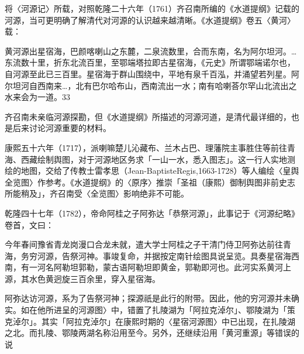 
\vfill
\begin{BookNotes}
\end{BookNotes}


将〈河源记〉所载，对照乾隆二十六年（1761）齐召南所编的《水道提纲》记载的河源，当可更明确了解清代对河源的认识越来越清晰。《水道提纲》卷五〈黄河〉载：

\begin{BookQuote}
黄河源出星宿海，巴颜喀喇山之东麓，二泉流数里，合而东南，名为阿尔坦河。…东流数十里，折东北流百里，至鄂端塔拉即古星宿海，《元史》所谓鄂端诺尔也，自河源至此已三百里。星宿海于群山围绕中，平地有泉千百泓，并涌望若列星。阿尔坦河自西南来…，北有巴尔哈布山，西南流出一水；南有哈喇荅尔罕山北流出之水来会为一道。33
\end{BookQuote}

齐召南未亲临河源探勘，但《水道提纲》所描述的河源河道，是清代最详细的，也是后来讨论河源重要的材料。

康熙五十六年（1717），派喇嘛楚儿沁藏布、兰木占巴、理藩院主事胜住等前往青海、西藏绘制舆图，对于河源地区务求「一山一水，悉入图志」。这一行人实地测绘的地图，交给了传教士雷孝思（Jean-BaptisteRegis,1663-1728）等人编绘〈皇舆全览图〉作参考。《水道提纲》的〈原序〉推崇「圣祖（康熙）御制舆图非前史志所能稍及」，齐召南受〈全览图〉影响绝非不可能。

乾隆四十七年（1782），帝命阿桂之子阿弥达「恭祭河源」，此事记于《河源纪略》卷首，文曰：

\begin{BookQuote}
今年春间豫省青龙岗漫口合龙未就，遣大学士阿桂之子干清门侍卫阿弥达前往青海，务穷河源，告祭河神。事竣复命，并据按定南针绘图具说呈览。具奏星宿海西南，有一河名阿勒坦郭勒，蒙古语阿勒坦即黄金，郭勒即河也。此河实系黄河上源，其水色黄迥旋三百余里，穿入星宿海。
\end{BookQuote}

阿弥达访河源，系为了告祭河神；探源祇是此行的附带。因此，他的穷河源并未确实。如在他所进呈的河源图〉中，错置了扎陵湖为「阿拉克淖尔」、鄂陵湖为「策克淖尔」。其实「阿拉克淖尔」在康熙时期的〈星宿河源图〉中已出现，在扎陵湖之北。而扎陵、鄂陵两湖名称沿用至今。另外，还继续沿用「黄河重源」等错误的说

